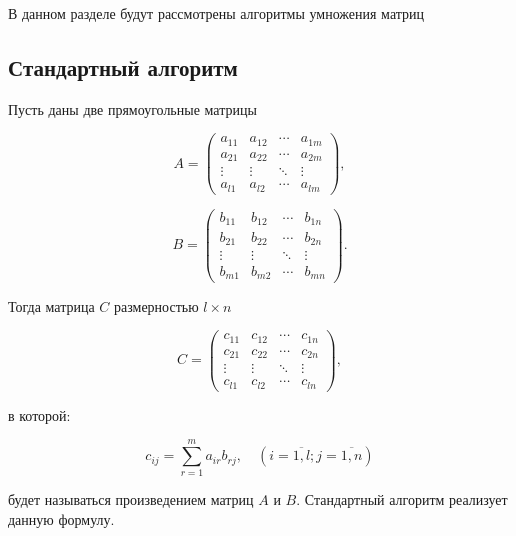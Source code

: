 В данном разделе будут рассмотрены алгоритмы умножения матриц

\subsection{Стандартный алгоритм}

Пусть даны две прямоугольные матрицы

\begin{equation}
    A =
      \begin{pmatrix}
        a_{11} & a_{12} & \cdots & a_{1m} \\
        a_{21} & a_{22} & \cdots & a_{2m} \\
        \vdots & \vdots & \ddots & \vdots \\
        a_{l1} & a_{l2} & \cdots & a_{lm}
      \end{pmatrix},
\end{equation}

\begin{equation}
    B =
    \begin{pmatrix}
      b_{11} & b_{12} & \cdots & b_{1n} \\
      b_{21} & b_{22} & \cdots & b_{2n} \\
      \vdots & \vdots & \ddots & \vdots \\
      b_{m1} & b_{m2} & \cdots & b_{mn}
    \end{pmatrix}.
\end{equation}

Тогда матрица $C$ размерностью $l \times n$

\begin{equation}
    C =
      \begin{pmatrix}
        c_{11} & c_{12} & \cdots & c_{1n} \\
        c_{21} & c_{22} & \cdots & c_{2n} \\
        \vdots & \vdots & \ddots & \vdots \\
        c_{l1} & c_{l2} & \cdots & c_{ln}
      \end{pmatrix},
\end{equation}

в которой:

\begin{equation}
    \displaystyle
    c_{ij} = \displaystyle\sum_{r = 1}^{m} a_{ir} b_{rj}, \quad (i = \overline{1, l}; j = \overline{1, n} )
\end{equation}

будет называться произведением матриц $A$ и $B$. Стандартный алгоритм
реализует данную формулу.

